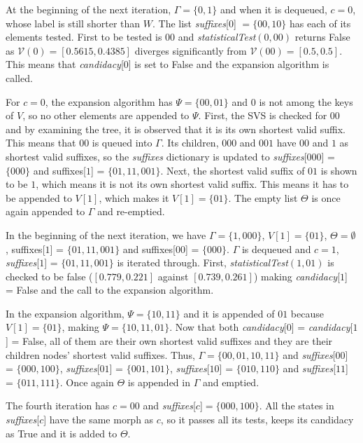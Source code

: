 {At the beginning of the next iteration, $\Gamma = \{0, 1\}$ and when it is dequeued, $c = 0$, whose label is still shorter than $W$. The list \textit{suffixes}[$0$] $= \{00, 10\}$ has each of its elements tested. First to be tested is $00$ and \textit{statisticalTest}$(0,00)$ returns False as $\mathcal{V}(0) = [0.5615, 0.4385]$ diverges significantly from $\mathcal{V}(00) = [0.5, 0.5]$. This means that \textit{candidacy}[$0$] is set to False and the expansion algorithm is called.

For $c = 0$, the expansion algorithm has $\Psi = \{00, 01\}$ and $0$ is not among the keys of $V$, so no other elements are appended to $\Psi$. First, the SVS is checked for $00$ and by examining the tree, it is observed that it is its own shortest valid suffix. This means that $00$ is queued into $\Gamma$. Its children, $000$ and $001$ have $00$ and $1$ as shortest valid suffixes, so the \textit{suffixes} dictionary is updated to \textit{suffixes}[$000$] = $\{000\}$ and suffixes[$1$] = $\{01, 11, 001\}$. Next, the shortest valid suffix of $01$ is shown to be $1$, which means it is not its own shortest valid suffix. This means it has to be appended to $V[1]$, which makes it $V[1] = \{01\}$. The empty list $\Theta$ is once again appended to $\Gamma$ and re-emptied. 

In the beginning of the next iteration, we have $\Gamma = \{1, 000\}$, $V[1] = \{01\}$, $\Theta = \emptyset$, suffixes[$1$] = $\{01, 11, 001\}$ and suffixes[$00$] = $\{000\}$. $\Gamma$ is dequeued and $c = 1$, \textit{suffixes}[$1$] = $\{01, 11, 001\}$ is iterated through. First, \textit{statisticalTest}$(1,01)$ is checked to be false ($[0.779, 0.221]$ against $[0.739, 0.261]$) making \textit{candidacy}[$1$] = False and the call to the expansion algorithm.

In the expansion algorithm, $\Psi = \{10, 11\}$ and it is appended of $01$ because $V[1] = \{01\}$, making $\Psi = \{10, 11, 01\}$. Now that both \textit{candidacy}[$0$] = \textit{candidacy}[$1$] = False, all of them are their own shortest valid suffixes and they are their children nodes' shortest valid suffixes. Thus, $\Gamma = \{00, 01, 10, 11\}$ and \textit{suffixes}[$00$] = $\{000, 100\}$, \textit{suffixes}[$01$] = $\{001, 101\}$, \textit{suffixes}[$10$] = $\{010, 110\}$ and \textit{suffixes}[$11$] = $\{011, 111\}$. Once again $\Theta$ is appended in $\Gamma$ and emptied.

The fourth iteration has $c = 00$ and \textit{suffixes}[$c$]$ = \{000, 100\}$. All the states in \textit{suffixes}[$c$] have the same morph as $c$, so it passes all its tests, keeps its candidacy as True and it is added to $\Theta$.

}

